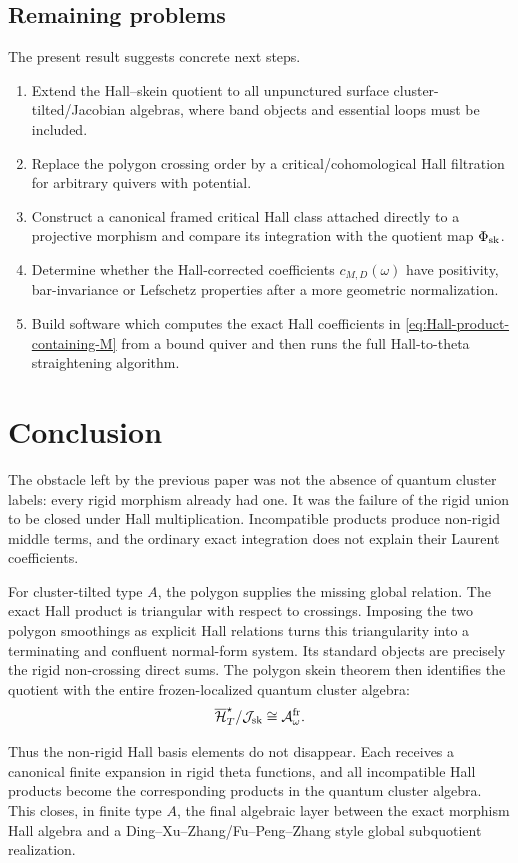 \subsection{Remaining problems}

The present result suggests concrete next steps.
\begin{enumerate}[label=(\arabic*),leftmargin=2.4em]
\item Extend the Hall--skein quotient to all unpunctured surface
      cluster-tilted/Jacobian algebras, where band objects and essential loops
      must be included.
\item Replace the polygon crossing order by a critical/cohomological Hall
      filtration for arbitrary quivers with potential.
\item Construct a canonical framed critical Hall class attached directly to a
      projective morphism and compare its integration with the quotient map
      $\Phi_{\rm sk}$.
\item Determine whether the Hall-corrected coefficients
      $c_{M,D}(\omega)$ have positivity, bar-invariance or Lefschetz
      properties after a more geometric normalization.
\item Build software which computes the exact Hall coefficients in
      \eqref{eq:Hall-product-containing-M} from a bound quiver and then runs
      the full Hall-to-theta straightening algorithm.
\end{enumerate}

\section{Conclusion}
\label{sec:conclusion}

The obstacle left by the previous paper was not the absence of quantum cluster
labels: every rigid morphism already had one.  It was the failure of the rigid
union to be closed under Hall multiplication.  Incompatible products produce
non-rigid middle terms, and the ordinary exact integration does not explain
their Laurent coefficients.

For cluster-tilted type $A$, the polygon supplies the missing global relation.
The exact Hall product is triangular with respect to crossings.  Imposing the
two polygon smoothings as explicit Hall relations turns this triangularity
into a terminating and confluent normal-form system.  Its standard objects are
precisely the rigid non-crossing direct sums.  The polygon skein theorem then
identifies the quotient with the entire frozen-localized quantum cluster
algebra:
\[
 \overline{\mathcal H}_{T}^{\star}/\mathcal J_{\mathrm{sk}}\cong\mathcal A_{\omega}^{\mathrm{fr}}.
\]

Thus the non-rigid Hall basis elements do not disappear.  Each receives a
canonical finite expansion in rigid theta functions, and all incompatible
Hall products become the corresponding products in the quantum cluster
algebra.  This closes, in finite type $A$, the final algebraic layer between
the exact morphism Hall algebra and a Ding--Xu--Zhang/Fu--Peng--Zhang style
global subquotient realization.
